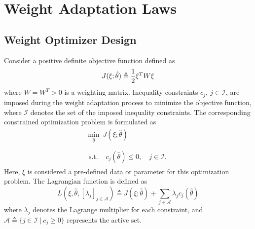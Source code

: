 \documentclass[lettersize,journal]{IEEEtran}
\begin{document}
\section{Weight Adaptation Laws}\label{sec:adap_laws}

\subsection{Weight Optimizer Design}

Consider a positive definite objective function defined as 
\begin{equation*}
    J(\xi;\hat\theta)\triangleq 
    {1\over 2} \xi^T   W\xi
\end{equation*}
where $W=W^T  >0$ is a weighting matrix.
Inequality constraints $c_j,\ j\in\mathcal{I}$, are imposed during the weight adaptation process to minimize the objective function, where $\mathcal I$ denotes the set of the imposed inequality constraints. The corresponding constrained optimization problem is formulated as
\begin{equation}
    \begin{matrix}
        \min_{\hat\theta} \ J(\xi;\hat\theta)
        \\ \\
        \begin{aligned}
        \text{s.t. }&c_{j}(\hat\theta) 
        \le0, \quad j\in\mathcal{I},
        \end{aligned}
    \end{matrix}
    \label{eq. train obj}
\end{equation}
Here, $\xi$ is considered a pre-defined data or parameter for this optimization problem. The Lagrangian function is defined as
\begin{equation*}
    L(\xi,\hat\theta,[\lambda_j]_{j\in\mathcal A}) \triangleq J(\xi;\hat\theta) + 
    \sum_{j\in\mathcal A}
    \lambda_{j}
    c_{j}(\hat\theta)
\end{equation*}
where $\lambda_j$ denotes the Lagrange multiplier for each constraint, and $\mathcal A \triangleq \{j\in\mathcal I\ |\ c_j\ge 0\}$ represents the active set.
\end{document}
